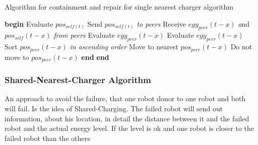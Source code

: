 \documentclass[
	a4paper,
	article,
	pagesize,
	pdftex,
	12pt,
	english,
	fleqn,
	final,
	]{scrartcl}
\begin{document}
\begin{algorithm}
	\caption{Algorithm for containment and repair for single nearest charger algorithm}
	\begin{algorithmic}[1]
		\Procedure{}{}
		\State \textbf{begin}
		\State Evaluate $pos_{self(t)}$
		\State Send $pos_{self(t)}$ \textit {to peers}
		\State Receive $egy_{peer}(t-x)$ \textit and $pos_{self}(t-x)$ \textit {from peers}
		\State Evaluate $egy_{peer}(t-x)$
		\State Evaluate $egy_{peer}(t-x)$
		\State Sort $pos_{peer}(t-x)$ \textit {in ascending order}
		\State Move to nearest $pos_{peer}(t-x)$
		\Else
		\State Do not move to $pos_{peer}(t-x)$
		\EndIf \textbf{end}
		\EndFor \textbf{end}
		\EndProcedure
	\end{algorithmic}
\end{algorithm}
\clearpage
\subsubsection{Shared-Nearest-Charger Algorithm}
An approach to avoid the failure, that one robot donor to one robot and both will fail. Is the idea of Shared-Charging. The failed robot will send out information, about his location, in detail the distance between it and the failed robot and the actual energy level. If the level is ok and one robot is closer to the failed robot than the others
\end{document}
